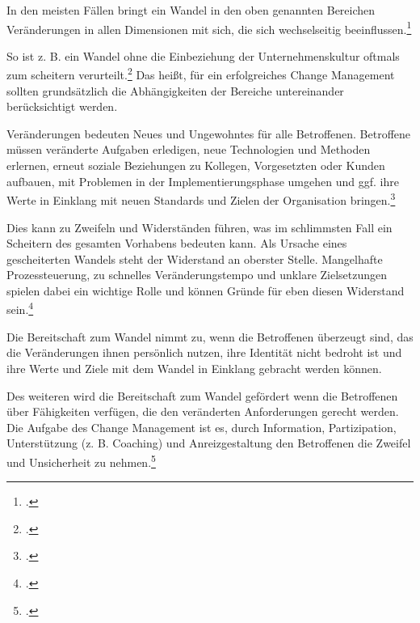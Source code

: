 In den meisten Fällen bringt ein Wandel in den oben genannten Bereichen Veränderungen in allen Dimensionen mit sich, die sich wechselseitig beeinflussen.\footcite{fisch_veraenderungen_2008} 

So ist z. B. ein Wandel ohne die Einbeziehung der Unternehmenskultur oftmals zum scheitern verurteilt.\footcite{lauer_change_2014} Das heißt, für ein erfolgreiches Change Management sollten grundsätzlich die Abhängigkeiten der Bereiche untereinander berücksichtigt werden.

Veränderungen bedeuten Neues und Ungewohntes für alle Betroffenen. 
Betroffene müssen veränderte Aufgaben erledigen, neue Technologien und Methoden erlernen, erneut soziale Beziehungen zu Kollegen, Vorgesetzten oder Kunden aufbauen, mit Problemen in der Implementierungsphase umgehen und ggf. ihre Werte in Einklang mit neuen Standards und Zielen der Organisation bringen.\footcite{fisch_veraenderungen_2008}

Dies kann zu Zweifeln und Widerständen führen, was im schlimmsten Fall ein Scheitern des gesamten Vorhabens bedeuten kann. Als Ursache eines gescheiterten Wandels steht der Widerstand an oberster Stelle. Mangelhafte Prozessteuerung, zu schnelles Veränderungstempo und unklare Zielsetzungen spielen dabei ein wichtige Rolle und können Gründe für eben diesen Widerstand sein.\footcite{lauer_change_2014}

Die Bereitschaft zum Wandel nimmt zu, wenn die Betroffenen überzeugt sind, das die Veränderungen ihnen persönlich nutzen, ihre Identität nicht bedroht ist und ihre Werte und Ziele mit dem Wandel in Einklang gebracht werden können.

Des weiteren wird die Bereitschaft zum Wandel gefördert wenn die Betroffenen über Fähigkeiten verfügen, die den veränderten Anforderungen gerecht werden. Die Aufgabe des Change Management ist es, durch Information, Partizipation, Unterstützung (z. B. Coaching) und Anreizgestaltung den Betroffenen die Zweifel und Unsicherheit zu nehmen.\footcite{fisch_veraenderungen_2008}

